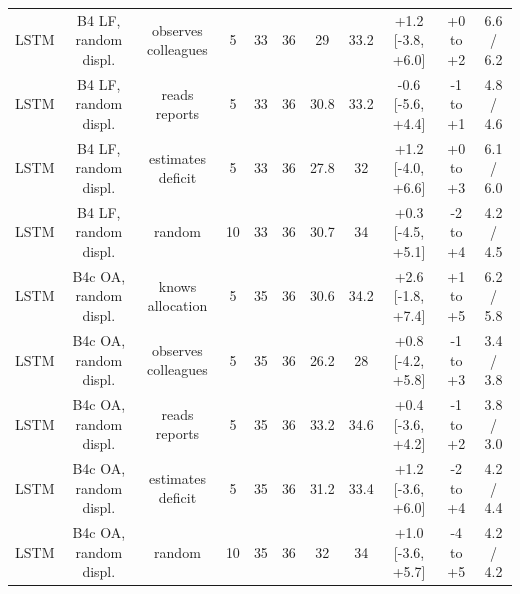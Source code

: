 \documentclass[10pt,onecolumn,letterpaper]{article}
\begin{document}
\begin{table}[!t]
{\begin{tabular}{lcccccccccc}
LSTM & B4 LF, random displ. & observes colleagues & 5 & 33 & 36 & 29 & 33.2 & +1.2 [-3.8, +6.0] & +0 to +2 & 6.6 / 6.2 \\
LSTM & B4 LF, random displ. & reads reports & 5 & 33 & 36 & 30.8 & 33.2 & -0.6 [-5.6, +4.4] & -1 to +1 & 4.8 / 4.6 \\
LSTM & B4 LF, random displ. & estimates deficit & 5 & 33 & 36 & 27.8 & 32 & +1.2 [-4.0, +6.6] & +0 to +3 & 6.1 / 6.0 \\
LSTM & B4 LF, random displ. & random & 10 & 33 & 36 & 30.7 & 34 & +0.3 [-4.5, +5.1] & -2 to +4 & 4.2 / 4.5 \\
LSTM & B4c OA, random displ. & knows allocation & 5 & 35 & 36 & 30.6 & 34.2 & +2.6 [-1.8, +7.4] & +1 to +5 & 6.2 / 5.8 \\
LSTM & B4c OA, random displ. & observes colleagues & 5 & 35 & 36 & 26.2 & 28 & +0.8 [-4.2, +5.8] & -1 to +3 & 3.4 / 3.8 \\
LSTM & B4c OA, random displ. & reads reports & 5 & 35 & 36 & 33.2 & 34.6 & +0.4 [-3.6, +4.2] & -1 to +2 & 3.8 / 3.0 \\
LSTM & B4c OA, random displ. & estimates deficit & 5 & 35 & 36 & 31.2 & 33.4 & +1.2 [-3.6, +6.0] & -2 to +4 & 4.2 / 4.4 \\
LSTM & B4c OA, random displ. & random & 10 & 35 & 36 & 32 & 34 & +1.0 [-3.6, +5.7] & -4 to +5 & 4.2 / 4.2 \\
\bottomrule
\end{tabular}}
\end{table}
\end{document}
